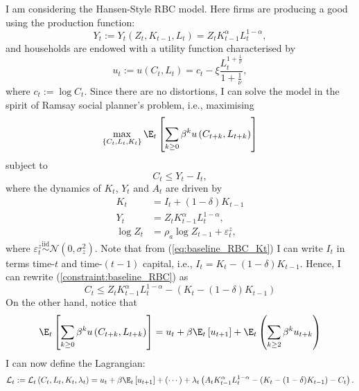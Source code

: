     I am  considering the Hansen-Style RBC model. Here firms are producing a good using the production function:
\begin{equation}\label{eq:baseline_RBC_Yt}
	Y_t := Y_t(Z_t, K_{t-1}, L_t) = Z_t  K_{t-1}^\alpha L_t^{1-\alpha},
\end{equation}
and households are endowed with a utility function characterised by
\begin{equation}
	u_t :=u\left(C_t, L_t\right) = c_t - \xi \frac{L_t^{1+\frac{1}{\nu}}}{1+\frac{1}{\nu}},
\end{equation}
where $c_t:= \log C_t$. Since there are no distortions, I can solve the model in the spirit of Ramsay social planner's problem, i.e., maximising
\begin{equation}
	\max_{\{C_t, L_t, K_t\}} \E_t\left[\sum_{k\geq 0}\beta^ku\left(C_{t+k}, L_{t+k}\right)\right]
\end{equation}
subject to
\begin{equation}
	C_t \leq Y_t - I_t, \label{constraint:baseline_RBC}
\end{equation}
where the dynamics of $K_t$, $Y_t$ and $A_t$ are driven by
\begin{align}
	K_t &= I_t + (1-\delta) K_{t-1} \label{eq:baseline_RBC_Kt}\\
	Y_t & = 	 Z_t K_{t-1}^\alpha L_t^{1-\alpha}, \label{eq:baseline_RBC_Yt_2}\\
	\log Z_t & = \rho_a \log Z_{t-1} + \varepsilon_t^z, \label{eq:baseline_RBC_At}
\end{align}
where $\varepsilon_t^z\overset{\text{iid}}{\sim}\mathcal{N}\left(0,\sigma_z^2\right)$. Note that from (\ref{eq:baseline_RBC_Kt}) I can write $I_t$ in terms time-$t$ and time-$(t-1)$ capital, i.e., $I_t = K_t - (1-\delta)K_{t-1}$. Hence, I can rewrite (\ref{constraint:baseline_RBC}) as
\begin{equation}\label{constraint:baseline_RBC_single_one}
	C_t \leq Z_t K_{t-1}^\alpha L_t^{1-\alpha} - \left(K_t - (1-\delta) K_{t-1}\right)
\end{equation}
On the other hand, notice that
$$
\E_t\left[\sum_{k\geq 0}\beta^ku\left(C_{t+k}, L_{t+k}\right)\right] = u_t + \beta\E_t\left[u_{t+1}\right] + \E_t\left(\sum_{k\geq 2}\beta^k u_{t+k}\right)
$$
I can now define the Lagrangian:
\begin{equation}
	\mathcal{L}_t := \mathcal{L}_t\left(C_t, L_t, K_t,\lambda_t\right) = u_t + \beta\E_t\left[u_{t+1}\right] + (\cdots) + \lambda_t\left( A_t K_{t-1}^\alpha L_t^{1-\alpha} - \left(K_t - (1-\delta) K_{t-1}\right) - C_t\right).
\end{equation}
